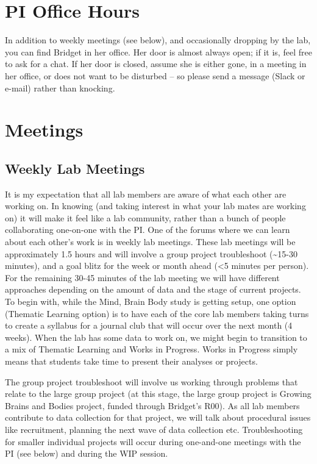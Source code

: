 \documentclass[]{book}
\begin{document}
\hypertarget{pi-office-hours}{%
\section{PI Office Hours}\label{pi-office-hours}}

In addition to weekly meetings (see below), and occasionally dropping by the lab, you can find Bridget in her office. Her door is almost always open; if it is, feel free to ask for a chat. If her door is closed, assume she is either gone, in a meeting in her office, or does not want to be disturbed -- so please send a message (Slack or e-mail) rather than knocking.

\hypertarget{meetings}{%
\section{Meetings}\label{meetings}}

\hypertarget{weekly-lab-meetings}{%
\subsection{Weekly Lab Meetings}\label{weekly-lab-meetings}}

It is my expectation that all lab members are aware of what each other are working on. In knowing (and taking interest in what your lab mates are working on) it will make it feel like a lab community, rather than a bunch of people collaborating one-on-one with the PI. One of the forums where we can learn about each other's work is in weekly lab meetings. These lab meetings will be approximately 1.5 hours and will involve a group project troubleshoot (\textasciitilde{}15-30 minutes), and a goal blitz for the week or month ahead (\textless{}5 minutes per person). For the remaining 30-45 minutes of the lab meeting we will have different approaches depending on the amount of data and the stage of current projects. To begin with, while the Mind, Brain Body study is getting setup, one option (Thematic Learning option) is to have each of the core lab members taking turns to create a syllabus for a journal club that will occur over the next month (4 weeks). When the lab has some data to work on, we might begin to transition to a mix of Thematic Learning and Works in Progress. Works in Progress simply means that students take time to present their analyses or projects.

The group project troubleshoot will involve us working through problems that relate to the large group project (at this stage, the large group project is Growing Brains and Bodies project, funded through Bridget's R00). As all lab members contribute to data collection for that project, we will talk about procedural issues like recruitment, planning the next wave of data collection etc. Troubleshooting for smaller individual projects will occur during one-and-one meetings with the PI (see below) and during the WIP session.
\end{document}
